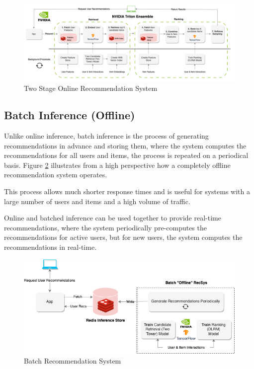 \begin{figure}[H]
    \centering
    \includegraphics[width=1\textwidth]{assets/online-two-stage-recommender-pipeline.png}
    \caption[Two Stage Online Recommendation System]{Two Stage Online Recommendation System~\cite{NvidiaFeatureStores}}
    \label{fig:TwoStageOnline}
\end{figure}



\subsection{Batch Inference (Offline)}
Unlike online inference, batch inference is the process of generating recommendations in advance and storing them, 
where the system computes the recommendations for all users and items, 
the process is repeated on a periodical basis.\cite{NvidiaFeatureStores} 
Figure \ref{fig:BatchRecSys} illustrates from a high perspective how a completely offline recommendation system operates.

This process allows much shorter response times and is useful for systems with a large number of users and items and a high volume of traffic.

Online and batched inference can be used together to provide real-time recommendations, where the system periodically pre-computes the recommendations for active users, but for new users, the system computes the recommendations in real-time.

\begin{figure}[H]
    \centering
    \includegraphics[width=1\textwidth]{assets/batch-recommendation-system.png}
    \caption[Batch Recommendation System]{Batch Recommendation System~\cite{NvidiaFeatureStores}}
    \label{fig:BatchRecSys}
\end{figure}
